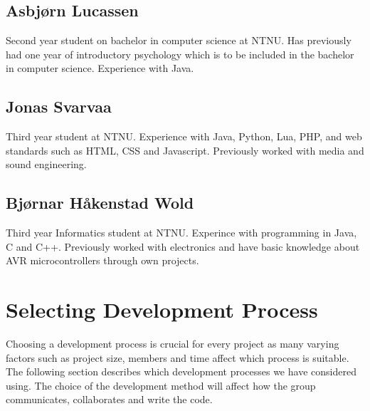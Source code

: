 \subsection{Asbjørn Lucassen}
Second year student on bachelor in computer science at NTNU. Has previously had one year of introductory psychology which is to be included in the bachelor in computer science.
Experience with Java.

\subsection{Jonas Svarvaa}
Third year student at NTNU. Experience with Java, Python, Lua, PHP, and web standards such as HTML, CSS and Javascript. Previously worked with media and sound engineering.

\subsection{Bjørnar Håkenstad Wold}
Third year Informatics student at NTNU. Experince with programming in Java, C and C++. Previously worked with electronics and have basic knowledge about AVR microcontrollers through own projects.


\newpage
\section{Selecting Development Process}
Choosing a development process is crucial for every project as many varying factors such as
project size, members and time affect which process is suitable. The following section describes
which development processes we have considered using. The choice of the development method
will affect how the group communicates, collaborates and write the code.

